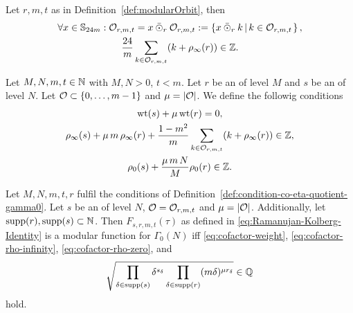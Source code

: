 \documentclass{article}
\begin{document}
\begin{Lemma}
  \label{thm:orbit-sum}
  \cite[Lemma~43]{Radu_RamanujanKolberg_2015}
  Let $r,m,t$ as in Definition~\ref{def:modularOrbit}, then
  \begin{gather}
  \forall x \in \setS_{24m}:
  \modularOrbit{r,m,t}
    = x \mathbin{\bar{\odot}_r} \modularOrbit{r,m,t}
    := \SetDef{x \mathbin{\bar{\odot}_r} k}{k\in \modularOrbit{r,m,t}},
    \\
    \frac{24}{m}\sum_{k \in \modularOrbit{r,m,t}} (k + \rho_\infty(r)) \in \setZ.
    \label{eq:orbit-rum}
  \end{gather}
\end{Lemma}



\begin{Definition}
  \label{def:cofactor-conditions}
  Let $M, N, m, t \in \mathbb{N}$ with $M,N>0$, $t<m$.
  Let $r$ be an  of level $M$ and $s$ be an
   of level $N$.
  Let $\mathcal{O} \subset \left\{0,\ldots,m-1\right\}$ and
  $\mu=\lvert\mathcal{O}\rvert$.
  We define the followig conditions
  \begin{gather}
    \operatorname{wt}(s) + \mu \operatorname{wt}(r)
    = 0,
    \label{eq:cofactor-weight}
    \\
    \rho_\infty(s) + \mu \, m \,\rho_\infty(r) +
     \frac{1-m^2}{m}\sum_{k \in \mathcal{O}_{r,m,t}} (k + \rho_\infty(r))
    \in \mathbb{Z},
    \label{eq:cofactor-rho-infinity}
    \\
    \rho_0(s) + \frac{\mu \,m\, N}{M} \rho_0(r)
    \in \mathbb{Z}.
    \label{eq:cofactor-rho-zero}
  \end{gather}
\end{Definition}



\begin{Theorem}\cite[Thm.~45]{Radu_RamanujanKolberg_2015}
  \label{thm:RaduConditions}
  Let $M, N, m, t, r$ fulfil the conditions of
  Definition~\ref{def:condition-co-eta-quotient-gamma0}.
  Let $s$ be an  of level $N$,
  $\mathcal{O}=\mathcal{O}_{r,m,t}$ and
  $\mu=\lvert\mathcal{O}\rvert$.
  Additionally, let $\operatorname{supp}(r), \operatorname{supp}(s) \subset \mathbb{N}$.
  Then $F_{s,r,m,t}(\tau)$ as defined in
  \eqref{eq:Ramanujan-Kolberg-Identity} is a modular function for
  $\Gamma_0(N)$ iff \eqref{eq:cofactor-weight},
  \eqref{eq:cofactor-rho-infinity}, \eqref{eq:cofactor-rho-zero}, and
  \begin{gather}
    \sqrt{
    \prod_{\delta\in\operatorname{supp}(s)}\delta^{s_\delta}
    \prod_{\delta\in\operatorname{supp}(r)} (m \delta)^{\mu r_\delta}
    }
    \in \mathbb{Q}\label{eq:Radu-productsquare}
  \end{gather}
  hold.
\end{Theorem}
\end{document}

